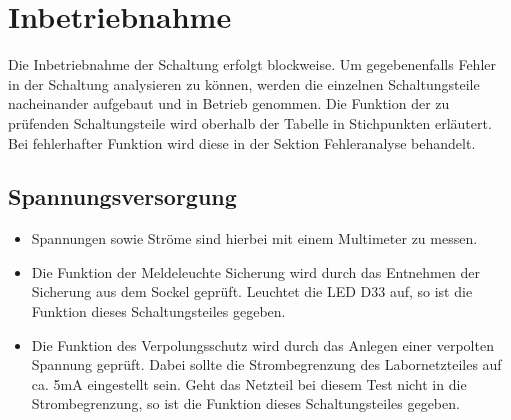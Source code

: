 \section{Inbetriebnahme}



Die Inbetriebnahme der Schaltung erfolgt blockweise. Um gegebenenfalls Fehler in der Schaltung analysieren zu können, werden die einzelnen Schaltungsteile nacheinander aufgebaut und in Betrieb genommen. Die Funktion der zu prüfenden Schaltungsteile wird oberhalb der Tabelle in Stichpunkten erläutert. Bei fehlerhafter Funktion wird diese in der Sektion \glqq Fehleranalyse\grqq{} behandelt.




\subsection{Spannungsversorgung}


\begin{itemize}
	\item{Spannungen sowie Ströme sind hierbei mit einem Multimeter zu messen.}
	
	\item{Die Funktion der \glqq Meldeleuchte Sicherung\grqq{}  wird durch das Entnehmen der Sicherung aus dem Sockel geprüft. Leuchtet die LED D33 auf, so ist die Funktion dieses Schaltungsteiles gegeben.}
	
	\item{Die Funktion des Verpolungsschutz wird durch das Anlegen einer verpolten Spannung geprüft. Dabei sollte die Strombegrenzung des Labornetzteiles auf ca. 5mA eingestellt sein. Geht das Netzteil bei diesem Test nicht in die Strombegrenzung, so ist die Funktion dieses Schaltungsteiles gegeben.}
\end{itemize}


